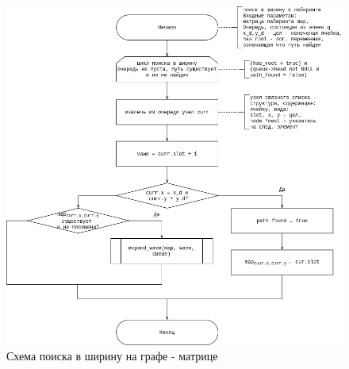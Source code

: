 \begin{center}
	\begin{figure}[H]
		\centering
		\includegraphics[width=0.9\linewidth]{assets/lee-BFS-search.drawio.png}
		\caption{Схема поиска в ширину на графе - матрице}
		\label{fig:lee-BFS}
	\end{figure}
\end{center}

